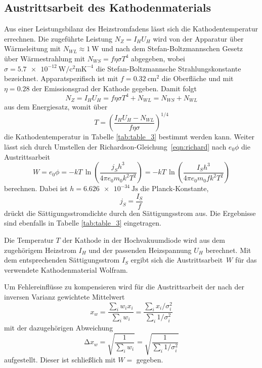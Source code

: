 \subsection{Austrittsarbeit des Kathodenmaterials}

Aus einer Leistungsbilanz des Heizstromfadens lässt sich die Kathodentemperatur errechnen. Die zugeführte Leistung
$N_Z = I_H U_H$ wird von der Apparatur über Wärmeleitung mit $N_{WL} \approx \qty{1}{\watt}$ und nach dem
Stefan-Boltzmannschen Gesetz über Wärmestrahlung mit $N_{WS} = f \eta \sigma T^4$ abgegeben, wobei
$\sigma = \qty{5.7e-12}{\watt\per\square\centi\meter\kelvin\tothe{-4}}$ die Stefan-Boltzmannsche
Strahlungskonstante bezeichnet. Apparatspezifisch ist mit $f = \qty{0.32}{\centi\meter\squared}$ die Oberfläche und mit
$\eta = \num{0.28}$ der Emissionsgrad der Kathode gegeben. Damit folgt
\begin{equation*}
	N_Z = I_H U_H = f \eta \sigma T^4 + N_{WL} = N_{WS} + N_{WL}
\end{equation*}
aus dem Energiesatz, womit über
\begin{equation*}
	T = \left( \frac{I_H U_H - N_{WL}}{f \eta \sigma} \right)^{\!\! 1/4}
\end{equation*}
die Kathodentemperatur in Tabelle \ref{tab:table_3} bestimmt werden kann. Weiter lässt sich durch Umstellen der
Richardson-Gleichung~\eqref{eqn:richard} nach $e_0 \phi$ die Austrittsarbeit
\begin{equation*}
	W = e_0 \phi = -kT \, \ln \!\left( \frac{j_S h^3}{4\pi e_0 m_0 k^2 T^2} \right)
	= -kT \, \ln \!\left( \frac{I_S h^3}{4\pi e_0 m_0 f k^2 T^2} \right)
\end{equation*}
berechnen. Dabei ist $h = \qty{6.626e-34}{\joule\second}$ die Planck-Konstante,
\begin{equation*}
	j_S = \frac{I_S}{f}
\end{equation*}
drückt die Sättigungsstromdichte durch den Sättigungsstrom aus. Die Ergebnisse sind ebenfalls in Tabelle \ref{tab:table_3} eingetragen.

\begin{table}[H]
	\caption{Die Temperatur $T$ der Kathode in der Hochvakuumdiode wird aus dem zugehörigem Heizstrom $I_H$ und der passenden
			 Heizspannung $U_H$ berechnet. Mit dem entsprechenden Sättigungsstrom $I_S$ ergibt sich die Austrittsarbeit~$W$ für
			 das verwendete Kathodenmaterial Wolfram.}
	\centering
	
	\label{tab:table_3}
\end{table}

Um Fehlereinflüsse zu kompensieren wird für die Austrittsarbeit der nach der inversen Varianz gewichtete Mittelwert
\begin{equation*}
	x_w = \frac{\sum_i w_i x_i}{\sum_i w_i} = \frac{\sum_i x_i / \sigma_i^2}{\sum_i 1/\sigma_i^2}
\end{equation*}
mit der dazugehörigen Abweichung
\begin{equation*}
	\increment x_w = \sqrt{\frac{1}{\sum_i w_i}} = \sqrt{\frac{1}{\sum_i 1/\sigma_i^2}}
\end{equation*}
aufgestellt. Dieser ist schließlich mit $W = $ gegeben.

